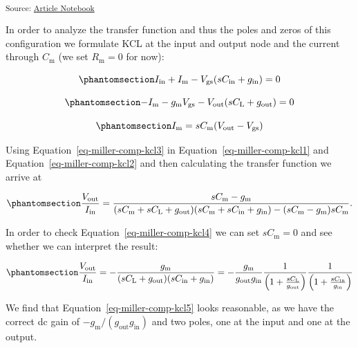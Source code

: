\documentclass[
  a4paper,
  DIV=11,
  numbers=noendperiod]{scrartcl}
\begin{document}
\textsubscript{Source:
\href{https://iic-jku.github.io/analog-circuit-design/index.qmd.html}{Article
Notebook}}

In order to analyze the transfer function and thus the poles and zeros
of this configuration we formulate KCL at the input and output node and
the current through \(C_\mathrm{m}\) (we set \(R_\mathrm{m}=0\) for
now):

\begin{equation}\phantomsection\label{eq-miller-comp-kcl1}{
I_\mathrm{in} + I_\mathrm{m} - V_\mathrm{gs} (s C_\mathrm{in} + g_\mathrm{in}) = 0
}\end{equation}

\begin{equation}\phantomsection\label{eq-miller-comp-kcl2}{
-I_\mathrm{m} - g_\mathrm{m}V_\mathrm{gs} - V_\mathrm{out} (s C_\mathrm{L} + g_\mathrm{out}) = 0 
}\end{equation}

\begin{equation}\phantomsection\label{eq-miller-comp-kcl3}{
I_\mathrm{m} = s C_\mathrm{m} (V_\mathrm{out} - V_\mathrm{gs}) 
}\end{equation}

Using Equation~\ref{eq-miller-comp-kcl3} in
Equation~\ref{eq-miller-comp-kcl1} and
Equation~\ref{eq-miller-comp-kcl2} and then calculating the transfer
function we arrive at

\begin{equation}\phantomsection\label{eq-miller-comp-kcl4}{
\frac{V_\mathrm{out}}{I_\mathrm{in}} = \frac{s C_\mathrm{m} - g_\mathrm{m}}{(s C_\mathrm{m} + s C_\mathrm{L} + g_\mathrm{out})(s C_\mathrm{m} + s C_\mathrm{in} + g_\mathrm{in}) - (s C_\mathrm{m} - g_\mathrm{m}) s C_\mathrm{m}}.
}\end{equation}

In order to check Equation~\ref{eq-miller-comp-kcl4} we can set
\(s C_\mathrm{m} = 0\) and see whether we can interpret the result:

\begin{equation}\phantomsection\label{eq-miller-comp-kcl5}{
\frac{V_\mathrm{out}}{I_\mathrm{in}} = -\frac{g_\mathrm{m}}{(s C_\mathrm{L} + g_\mathrm{out})(s C_\mathrm{in} + g_\mathrm{in})} = -\frac{g_\mathrm{m}}{g_\mathrm{out} g_\mathrm{in}}
\frac{1}{\left( 1 + \frac{s C_\mathrm{L}}{g_\mathrm{out}} \right)}
\frac{1}{\left( 1 + \frac{s C_\mathrm{in}}{g_\mathrm{in}} \right)}
}\end{equation}

We find that Equation~\ref{eq-miller-comp-kcl5} looks reasonable, as we
have the correct dc gain of
\(-g_\mathrm{m}/(g_\mathrm{out} g_\mathrm{in})\) and two poles, one at
the input and one at the output.
\end{document}
